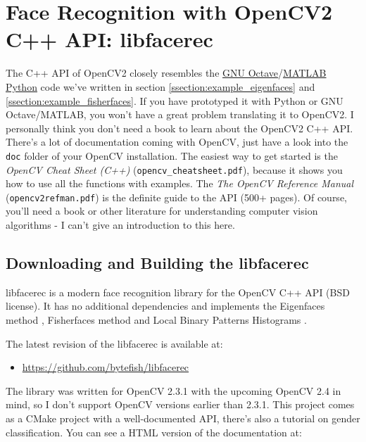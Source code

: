\section{Face Recognition with OpenCV2 C++ API: libfacerec}

The C++ API of OpenCV2 closely resembles the \ifx\python\undefined \href{http://www.gnu.org/software/octave/}{GNU Octave}/\href{http://www.mathworks.com}{MATLAB} \else \href{http://www.python.org}{Python} \fi code we've written in section \ref{ssection:example_eigenfaces} and \ref{ssection:example_fisherfaces}. If you have prototyped it with Python or GNU Octave/MATLAB, you won't have a great problem translating it to OpenCV2. I personally think you don't need a book to learn about the OpenCV2 C++ API. There's a lot of documentation coming with OpenCV, just have a look into the \lstinline|doc| folder of your OpenCV installation. The easiest way to get started is the \textit{OpenCV Cheat Sheet (C++)} (\lstinline|opencv_cheatsheet.pdf|), because it shows you how to use all the functions with examples. The \textit{The OpenCV Reference Manual} (\lstinline|opencv2refman.pdf|) is the definite guide to the API (500+ pages). Of course, you'll need a book or other literature for understanding computer vision algorithms - I can't give an introduction to this here.

\subsection{Downloading and Building the libfacerec}

libfacerec is a modern face recognition library for the OpenCV C++ API (BSD license). It has no additional dependencies and implements the Eigenfaces method \cite{PT91}, Fisherfaces method \cite{belhumeru97} and Local Binary Patterns Histograms \cite{Ahonen04}. 

The latest revision of the libfacerec is available at:

\begin{itemize}
   \item \url{https://github.com/bytefish/libfacerec}
\end{itemize}

The library was written for OpenCV 2.3.1 with the upcoming OpenCV 2.4 in mind, so I don't support OpenCV versions earlier than 2.3.1. This project comes as a CMake project with a well-documented API, there's also a tutorial on gender classification. You can see a HTML version of the documentation at:

